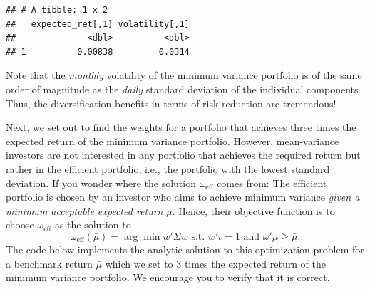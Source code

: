 \documentclass[
]{krantz}
\begin{document}
\begin{verbatim}
## # A tibble: 1 x 2
##   expected_ret[,1] volatility[,1]
##              <dbl>          <dbl>
## 1          0.00838         0.0314
\end{verbatim}

Note that the \emph{monthly} volatility of the minimum variance portfolio is of the same order of magnitude as the \emph{daily} standard deviation of the individual components. Thus, the diversification benefits in terms of risk reduction are tremendous!

Next, we set out to find the weights for a portfolio that achieves three times the expected return of the minimum variance portfolio. However, mean-variance investors are not interested in any portfolio that achieves the required return but rather in the efficient portfolio, i.e., the portfolio with the lowest standard deviation.
If you wonder where the solution \(\omega_\text{eff}\) comes from: The efficient portfolio is chosen by an investor who aims to achieve minimum variance \emph{given a minimum acceptable expected return} \(\bar{\mu}\). Hence, their objective function is to choose \(\omega_\text{eff}\) as the solution to
\[\omega_\text{eff}(\bar{\mu}) = \arg\min w'\Sigma w \text{ s.t. } w'\iota = 1 \text{ and } \omega'\mu \geq \bar{\mu}.\]
The code below implements the analytic solution to this optimization problem for a benchmark return \(\bar\mu\) which we set to 3 times the expected return of the minimum variance portfolio. We encourage you to verify that it is correct.
\end{document}
